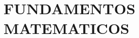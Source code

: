 \chapter{FUNDAMENTOS MATEMATICOS}
\label{cap:marcoteorico}
\setcounter{secnumdepth}{0}
\blindtext
\blindmathpaper

\setcounter{secnumdepth}{3}
\blinddocument
